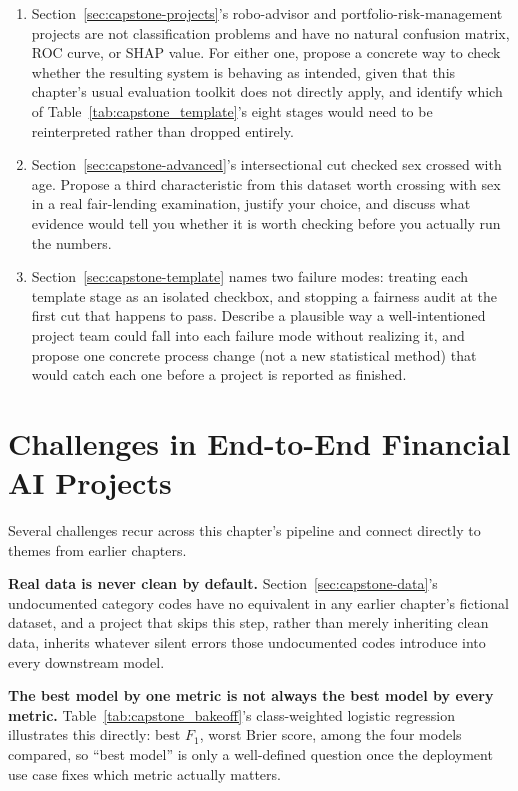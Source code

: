 \documentclass[../ai_in_finance]{subfiles}
\begin{document}
\begin{enumerate}
    \item Section~\ref{sec:capstone-projects}'s robo-advisor and portfolio-risk-management projects are not classification problems and have no natural confusion matrix, ROC curve, or SHAP value. For either one, propose a concrete way to check whether the resulting system is behaving as intended, given that this chapter's usual evaluation toolkit does not directly apply, and identify which of Table~\ref{tab:capstone_template}'s eight stages would need to be reinterpreted rather than dropped entirely.
    \item Section~\ref{sec:capstone-advanced}'s intersectional cut checked sex crossed with age. Propose a third characteristic from this dataset worth crossing with sex in a real fair-lending examination, justify your choice, and discuss what evidence would tell you whether it is worth checking before you actually run the numbers.
    \item Section~\ref{sec:capstone-template} names two failure modes: treating each template stage as an isolated checkbox, and stopping a fairness audit at the first cut that happens to pass. Describe a plausible way a well-intentioned project team could fall into each failure mode without realizing it, and propose one concrete process change (not a new statistical method) that would catch each one before a project is reported as finished.
\end{enumerate}

\section{Challenges in End-to-End Financial AI Projects}

Several challenges recur across this chapter's pipeline and connect directly to themes from earlier chapters.

\textbf{Real data is never clean by default.} Section~\ref{sec:capstone-data}'s undocumented category codes have no equivalent in any earlier chapter's fictional dataset, and a project that skips this step, rather than merely inheriting clean data, inherits whatever silent errors those undocumented codes introduce into every downstream model.

\textbf{The best model by one metric is not always the best model by every metric.} Table~\ref{tab:capstone_bakeoff}'s class-weighted logistic regression illustrates this directly: best $F_1$, worst Brier score, among the four models compared, so ``best model'' is only a well-defined question once the deployment use case fixes which metric actually matters.
\end{document}
